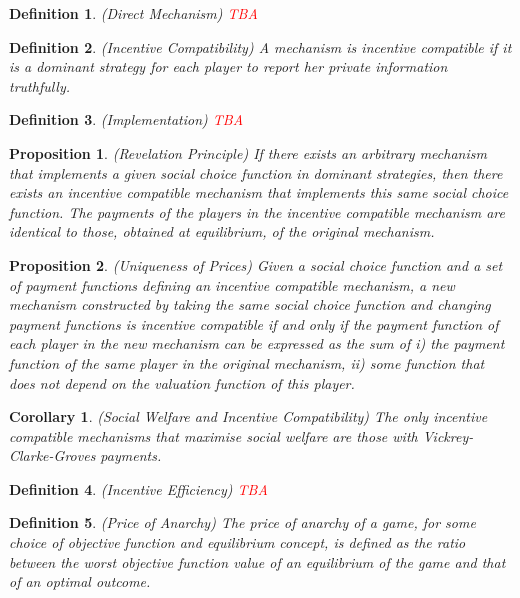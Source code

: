 \documentclass{article}
\newtheorem{proposition}{Proposition}
\newtheorem{definition}{Definition}
\newtheorem{corollary}{Corollary}
\begin{document}
\begin{definition}
(Direct Mechanism) \textcolor{red}{TBA}
\end{definition}

\begin{definition}
(Incentive Compatibility) A mechanism is incentive compatible if it is a dominant strategy for each player to report her private information truthfully.
\end{definition}

\begin{definition}
(Implementation) \textcolor{red}{TBA}
\end{definition}

\begin{proposition}
(Revelation Principle) If there exists an arbitrary mechanism that implements a given social choice function in dominant strategies, then there exists an incentive compatible mechanism that implements this same social choice function. The payments of the players in the incentive compatible mechanism are identical to those, obtained at equilibrium, of the original mechanism.
\end{proposition}

\begin{proposition}
(Uniqueness of Prices) Given a social choice function and a set of payment functions defining an incentive compatible mechanism, a new mechanism constructed by taking the same social choice function and changing payment functions is incentive compatible if and only if the payment function of each player in the new mechanism can be expressed as the sum of i) the payment function of the same player in the original mechanism, ii) some function that does not depend on the valuation function of this player.
\end{proposition}

\begin{corollary}
(Social Welfare and Incentive Compatibility) The only incentive compatible mechanisms that maximise social welfare are those with Vickrey-Clarke-Groves payments.
\end{corollary}

\begin{definition}
(Incentive Efficiency) \textcolor{red}{TBA}
\end{definition}

\begin{definition}
(Price of Anarchy) The price of anarchy of a game, for some choice of objective function and equilibrium concept, is defined as the ratio between the worst objective function value of an equilibrium of the game and that of an optimal outcome.
\end{definition}
\end{document}
